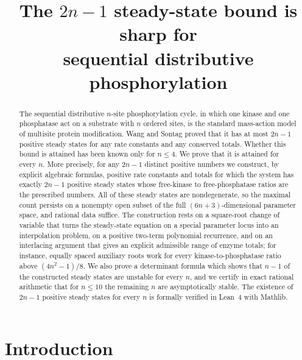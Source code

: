 \documentclass[11pt]{article}
\title{The \(2n-1\) steady-state bound is sharp for\\ sequential distributive phosphorylation}
\author{}
\date{}
\theoremstyle{plain}
\theoremstyle{definition}
\theoremstyle{remark}
\numberwithin{equation}{section}
\begin{document}
\maketitle

\begin{abstract}
The sequential distributive \(n\)-site phosphorylation cycle, in which one kinase and one
phosphatase act on a substrate with \(n\) ordered sites, is the standard mass-action model of
multisite protein modification. Wang and Sontag proved that it has at most \(2n-1\) positive
steady states for any rate constants and any conserved totals. Whether this bound is attained
has been known only for \(n\le 4\). We prove that it is attained for every \(n\). More
precisely, for any \(2n-1\) distinct positive numbers we construct, by explicit algebraic
formulas, positive rate constants and totals for which the system has exactly \(2n-1\) positive
steady states whose free-kinase to free-phosphatase ratios are the prescribed numbers. All of
these steady states are nondegenerate, so the maximal count persists on a nonempty open subset
of the full \((6n+3)\)-dimensional parameter space, and rational data suffice. The construction
rests on a square-root change of variable that turns the steady-state equation on a special
parameter locus into an interpolation problem, on a positive two-term polynomial recurrence, and
on an interlacing argument that gives an explicit admissible range of enzyme totals; for
instance, equally spaced auxiliary roots work for every kinase-to-phosphatase ratio above
\((4n^2-1)/8\). We also prove a determinant formula which shows that \(n-1\) of the constructed
steady states are unstable for every \(n\), and we certify in exact rational arithmetic that
for \(n\le 10\) the remaining \(n\) are asymptotically stable. The existence of \(2n-1\)
positive steady states for every \(n\) is formally verified in Lean~4 with Mathlib.
\end{abstract}

\section{Introduction}
\end{document}
